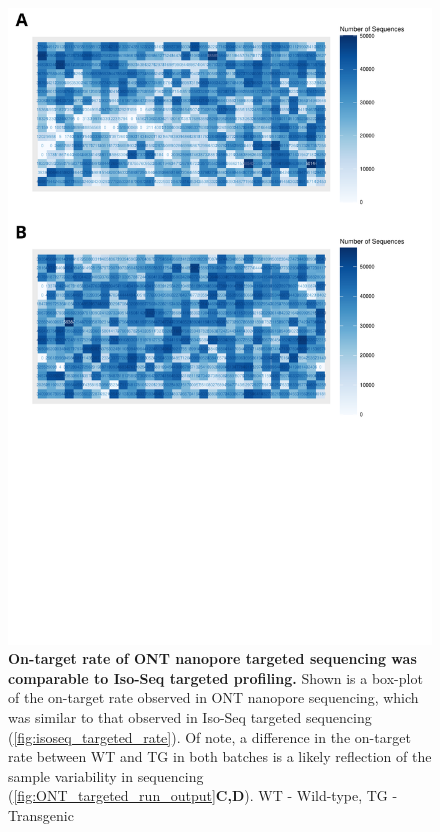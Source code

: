\begin{figure}[]
	\centering
	\includegraphics[page=5,trim={0 27cm 0 0cm},clip,scale = 0.5]{Figures/ONTTargetedTranscriptome.pdf}
	\captionsetup{width=0.95\textwidth}
	\caption[On-target rate of ONT targeted profiling]%
	{\textbf{On-target rate of ONT nanopore targeted sequencing was comparable to Iso-Seq targeted profiling.} Shown is a box-plot of the on-target rate observed in ONT nanopore sequencing, which was similar to that observed in Iso-Seq targeted sequencing (\cref{fig:isoseq_targeted_rate}). Of note, a difference in the on-target rate between WT and TG in both batches is a likely reflection of the sample variability in sequencing (\cref{fig:ONT_targeted_run_output}\textbf{C,D}). WT - Wild-type, TG - Transgenic}
	\label{fig:ont_targeted_rate}
\end{figure}


